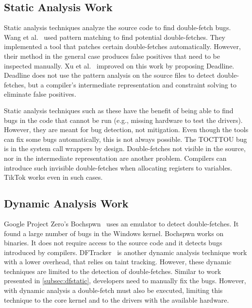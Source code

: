 \documentclass[conference]{IEEEtran}
\newcommand{\sysname}{TikTok}
\begin{document}
\subsection{Static Analysis Work}
\label{subsec:dfstatic}
Static analysis techniques analyze the source code to find double-fetch bugs.
Wang et al.~\cite{wang2017double} used pattern matching to find potential
double-fetches. They implemented a tool that patches certain double-fetches
automatically. However, their method in the general case produces false
positives that need to be inspected manually. Xu et al.~\cite{xu2018precise}
improved on this work by proposing Deadline. Deadline does not use the pattern 
analysis on the source files to detect double-fetches, but a compiler's
intermediate representation and constraint solving to eliminate false positives.

Static analysis techniques such as these have the benefit of being able to find
bugs in the code that cannot be run (e.g., missing hardware to test the
drivers). However, they are meant for bug detection, not mitigation. Even though
the tools can fix some bugs automatically, this is not always possible. The
TOCTTOU bug is in the system call wrappers by design. Double-fetches not visible
in the source, nor in the intermediate representation are another problem.
Compilers can introduce such invisible double-fetches when allocating registers
to variables. \sysname{} works even in such cases.

\subsection{Dynamic Analysis Work}
\label{subsec:dfdynamic}
Google Project Zero's Bochspwn~\cite{jurczyk2013bochspwn} uses an emulator to
detect double-fetches. It found a large number of bugs in the Windows kernel.
Bochspwn works on binaries. It does not require access to the source code and it
detects bugs introduced by compilers. DFTracker~\cite{wang2019dftracker} is
another dynamic analysis technique work with a lower overhead, that relies on
taint tracking. However, these dynamic techniques are limited to the detection
of double-fetches. Similar to work presented in \autoref{subsec:dfstatic},
developers need to manually fix the bugs. However, with dynamic analysis a
double-fetch must also be executed, limiting this technique to the core kernel
and to the drivers with the available hardware.
\end{document}
